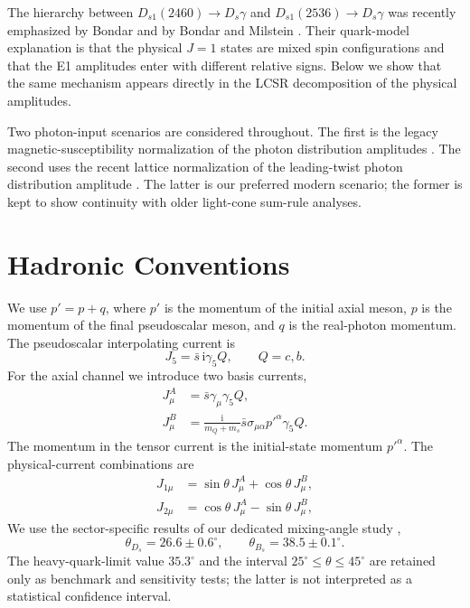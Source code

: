 \documentclass[11pt]{article}
\newcommand{\ii}{\mathrm{i}}
\newcommand{\Ds}{D_s}
\newcommand{\Dsone}{D_{s1}}
\begin{document}
The hierarchy between $\Dsone(2460)\to\Ds\gamma$ and
$\Dsone(2536)\to\Ds\gamma$ was recently emphasized by Bondar and by
Bondar and Milstein \cite{Bondar2025Why,BondarMilstein2025}.  Their
quark-model explanation is that the physical $J=1$ states are mixed spin
configurations and that the E1 amplitudes enter with different relative signs.
Below we show that the same mechanism appears directly in the LCSR
decomposition of the physical amplitudes.

Two photon-input scenarios are considered throughout.  The first is the legacy
magnetic-susceptibility normalization of the photon distribution amplitudes
\cite{Ball:2002ps,Rohrwild2007}.  The second uses the recent lattice
normalization of the leading-twist photon distribution amplitude
\cite{Bacchio2024}.  The latter is our preferred modern scenario; the former is
kept to show continuity with older light-cone sum-rule analyses.

\section{Hadronic Conventions}

We use $p'=p+q$, where $p'$ is the momentum of the initial axial meson, $p$ is the
momentum of the final pseudoscalar meson, and $q$ is the real-photon momentum.
The pseudoscalar interpolating current is
\begin{equation}
  J_5=\bar s\,\ii\gamma_5 Q,\qquad Q=c,b .
\end{equation}
For the axial channel we introduce two basis currents,
\begin{align}
  J^A_\mu &= \bar s\gamma_\mu\gamma_5 Q,\\
  J^B_\mu &= \frac{\ii}{m_Q+m_s}\bar s\sigma_{\mu\alpha}p'^\alpha\gamma_5 Q.
  \label{eq:basis-currents}
\end{align}
The momentum in the tensor current is the initial-state momentum $p'^\alpha$.
The physical-current combinations are
\begin{align}
  J_{1\mu} &= \sin\theta\,J^A_\mu+\cos\theta\,J^B_\mu,\\
  J_{2\mu} &= \cos\theta\,J^A_\mu-\sin\theta\,J^B_\mu ,
  \label{eq:physical-currents}
\end{align}
We use the sector-specific results of our dedicated mixing-angle study
\cite{AlievBilmisSavci2024},
\begin{equation}
\theta_{D_s}=26.6\pm0.6^\circ,\qquad
\theta_{B_s}=38.5\pm0.1^\circ.
\end{equation}
The heavy-quark-limit value $35.3^\circ$ and the interval
$25^\circ\leq\theta\leq45^\circ$ are retained only as benchmark and
sensitivity tests; the latter is not interpreted as a statistical confidence
interval.
\end{document}
